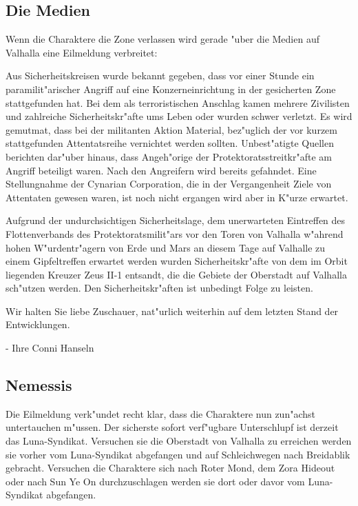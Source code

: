 
\subsection{Die Medien} 
Wenn die Charaktere die Zone verlassen wird gerade "uber die Medien auf Valhalla eine Eilmeldung verbreitet:

\begin{speech}
Aus Sicherheitskreisen wurde bekannt gegeben, dass vor einer Stunde ein paramilit"arischer Angriff auf eine Konzerneinrichtung in der gesicherten Zone stattgefunden hat. Bei dem als terroristischen Anschlag kamen mehrere Zivilisten und zahlreiche Sicherheitskr"afte ums Leben oder wurden schwer verletzt. Es wird gemutma\3t, dass bei der militanten Aktion Material, bez"uglich der vor kurzem stattgefunden Attentatsreihe vernichtet werden sollten. Unbest"atigte Quellen berichten dar"uber hinaus, dass Angeh"orige der Protektoratsstreitkr"afte am Angriff beteiligt waren. Nach den Angreifern wird bereits gefahndet. Eine Stellungnahme der Cynarian Corporation, die in der Vergangenheit Ziele von Attentaten gewesen waren, ist noch nicht ergangen wird aber in K"urze erwartet.

Aufgrund der undurchsichtigen Sicherheitslage, dem unerwarteten Eintreffen des Flottenverbands des Protektoratsmilit"ars vor den Toren von Valhalla w"ahrend hohen W"urdentr"agern von Erde und Mars an diesem Tage auf Valhalle zu einem Gipfeltreffen erwartet werden wurden Sicherheitskr"afte von dem im Orbit liegenden Kreuzer Zeus II-1 entsandt, die die Gebiete der Oberstadt auf Valhalla sch"utzen werden. Den Sicherheitskr"aften ist unbedingt Folge zu leisten.

Wir halten Sie liebe Zuschauer, nat"urlich weiterhin auf dem letzten Stand der Entwicklungen.

\nopagebreak
- Ihre Conni Hanseln
\end{speech}

\subsection{Nemessis} 
Die Eilmeldung verk"undet recht klar, dass die Charaktere nun zun"achst untertauchen m"ussen. Der sicherste sofort verf"ugbare Unterschlupf ist derzeit das Luna-Syndikat. Versuchen sie die Oberstadt von Valhalla zu erreichen werden sie vorher vom Luna-Syndikat abgefangen und auf Schleichwegen nach Breidablik gebracht. Versuchen die Charaktere sich nach Roter Mond, dem Zora Hideout oder nach Sun Ye On durchzuschlagen werden sie dort oder davor vom Luna-Syndikat abgefangen.

